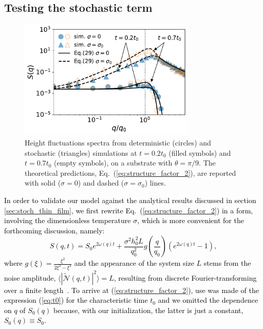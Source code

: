 \subsection{Testing the stochastic term}\label{subsec:validation}
\begin{figure}
    \centering
    \includegraphics[width=0.75\textwidth]{graphics/spectrum_theta_20_nob_fill_pattern.pdf}
    \caption{Height fluctuations spectra from deterministic (circles) and stochastic (triangles) simulations at $t=0.2 t_0$ (filled symbols) and $t=0.7 t_0$ (empty symbols), 
    on a substrate with $\theta =\pi/9$. The theoretical predictions, Eq.~(\ref{eq:structure_factor_2}), are reported with solid ($\sigma=0$) and dashed ($\sigma = \sigma_0$) lines.
    }
    \label{fig:theory_simulation_structure_factor}
\end{figure}
\textcolor{black}{In order to validate our model against the analytical results discussed
in section \ref{sec:stoch_thin_film}, we first rewrite Eq.~(\ref{eq:structure_factor_2}) in a form, involving the dimensionless temperature $\sigma$, which is more 
convenient for the forthcoming discussion, namely:
\begin{equation}\label{eq:structure_factor_2}
    S(q,t) = S_0 e^{2\omega(q)t} + \frac{\sigma^2 h_0^2 L}{q_0^2}g\left(\frac{q}{q_0}\right)(e^{2\omega(q)t} - 1),
\end{equation}
where $g(\xi) = \frac{\xi^2}{2\xi^2 - \xi^4}$ and the appearance of the system size $L$ stems from the noise amplitude, $\langle |\tilde{\mathcal{N}}(q,t)|^2 \rangle = L$, 
resulting from discrete Fourier-transforming 
over a finite length~\cite{zhangMolecularSimulationThin2019,zhangNanoscaleThinfilmFlows2020}. To arrive at (\ref{eq:structure_factor_2}), use was made of the expression (\ref{eq:t0}) for the characteristic time $t_0$
and we omitted the dependence on $q$ of $S_0(q)$ because, with our initialization, the latter is just a constant, $S_0(q)\equiv S_0$.}
